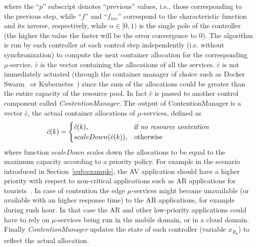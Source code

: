 where the ``$p$'' subscript denotes ``previous'' values, i.e., those corresponding to the previous step, while ``$f$'' and ``$f_{inv}$'' correspond to the characteristic function and its inverse, respectively, while $\alpha \in [0,1)$ is the single pole of the controller (the higher the value the faster will be the error convergence to $0$). The algorithm is run by each controller at each control step independently (i.e. without synchronization) to compute the next container allocation for the corresponding $\mu$-service. $\hat{c}$ is the vector containing the allocations of all the services. $\hat{c}$ is not immediately actuated (through the container manager of choice such as Docker Swarm~\cite{Swarm} or Kubernetes~\cite{Kubernetes}) since the sum of the allocations could be greater than the entire capacity of the resource pool. In fact $\hat{c}$  is passed to another control component called  \textit{ContentionManager}. The  output of ContentionManager is a vector $\bar{c}$, the actual container allocations of $\mu$-services, defined as 
\begin{equation}
		\bar{c}(k) =
	\begin{cases}
			\hat{c}(k),& \text{if \textit{no resource contention}}\\
			scaleDown(\hat{c}(k)),              & \text{otherwise}
	\end{cases}
\label{eqn:CsysModel-SS}
\end{equation} 
where function $scaleDown$ scales down the allocations to be equal to the maximum capacity according to a priority policy. 
For example in the scenario introduced in Section~\ref{sub:example}, the AV application should have a higher priority with respect to non-critical applications such as AR applications for tourists~\cite{GarrigaMendonca2017}. In case of contention the edge $\mu$-services might become unavailable (or available with an higher response time) to the AR applications, for example during rush hour. In that case the AR and other low-priority applications could have to rely on $\mu$-services being run in the mobile domain, or in a cloud domain. Finally \textit{ContentionManager} updates the state of each controller (variable $x_{R_p}$) to reflect the actual allocation.


